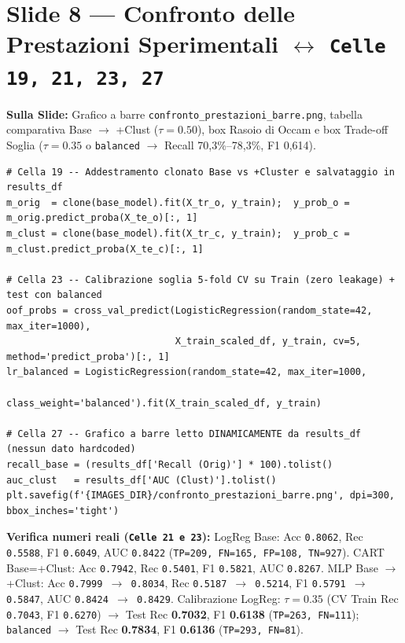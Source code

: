 \documentclass[10pt, a4paper]{article}
\begin{document}
\section*{Slide 8 --- Confronto delle Prestazioni Sperimentali $\leftrightarrow$ \texttt{Celle 19, 21, 23, 27}}
\noindent\textbf{Sulla Slide:} Grafico a barre \texttt{confronto\_prestazioni\_barre.png}, tabella comparativa Base $\rightarrow$ +Clust ($\tau=0.50$), box Rasoio di Occam e box Trade-off Soglia ($\tau=0.35$ o \texttt{balanced} $\rightarrow$ Recall 70,3\%--78,3\%, F1 0,614).
\begin{lstlisting}
# Cella 19 -- Addestramento clonato Base vs +Cluster e salvataggio in results_df
m_orig  = clone(base_model).fit(X_tr_o, y_train);  y_prob_o = m_orig.predict_proba(X_te_o)[:, 1]
m_clust = clone(base_model).fit(X_tr_c, y_train);  y_prob_c = m_clust.predict_proba(X_te_c)[:, 1]

# Cella 23 -- Calibrazione soglia 5-fold CV su Train (zero leakage) + test con balanced
oof_probs = cross_val_predict(LogisticRegression(random_state=42, max_iter=1000),
                              X_train_scaled_df, y_train, cv=5, method='predict_proba')[:, 1]
lr_balanced = LogisticRegression(random_state=42, max_iter=1000,
                                 class_weight='balanced').fit(X_train_scaled_df, y_train)

# Cella 27 -- Grafico a barre letto DINAMICAMENTE da results_df (nessun dato hardcoded)
recall_base = (results_df['Recall (Orig)'] * 100).tolist()
auc_clust   = results_df['AUC (Clust)'].tolist()
plt.savefig(f'{IMAGES_DIR}/confronto_prestazioni_barre.png', dpi=300, bbox_inches='tight')
\end{lstlisting}
\noindent\textbf{Verifica numeri reali (\texttt{Celle 21 e 23}):}
LogReg Base: Acc \texttt{0.8062}, Rec \texttt{0.5588}, F1 \texttt{0.6049}, AUC \texttt{0.8422} (\texttt{TP=209, FN=165, FP=108, TN=927}).
CART Base=+Clust: Acc \texttt{0.7942}, Rec \texttt{0.5401}, F1 \texttt{0.5821}, AUC \texttt{0.8267}.
MLP Base $\rightarrow$ +Clust: Acc \texttt{0.7999 $\rightarrow$ 0.8034}, Rec \texttt{0.5187 $\rightarrow$ 0.5214}, F1 \texttt{0.5791 $\rightarrow$ 0.5847}, AUC \texttt{0.8424 $\rightarrow$ 0.8429}.
Calibrazione LogReg: $\tau=0.35$ (CV Train Rec \texttt{0.7043}, F1 \texttt{0.6270}) $\rightarrow$ Test Rec \textbf{0.7032}, F1 \textbf{0.6138} (\texttt{TP=263, FN=111}); \texttt{balanced} $\rightarrow$ Test Rec \textbf{0.7834}, F1 \textbf{0.6136} (\texttt{TP=293, FN=81}).
\end{document}
